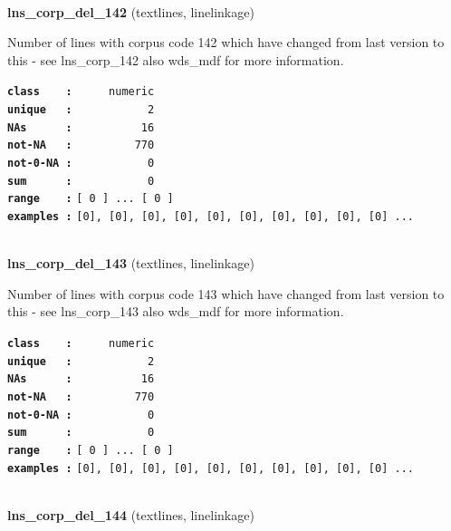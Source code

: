 \documentclass[]{article}
\begin{document}
~

\textbf{lns\_corp\_del\_142} (textlines, linelinkage)

Number of lines with corpus code 142 which have changed from last
version to this - see lns\_corp\_142 also wds\_mdf for more information.

\textbf{\texttt{class\ \ \ \ :}} \texttt{~~~~~numeric}\\
\textbf{\texttt{unique\ \ \ :}} \texttt{~~~~~~~~~~~2}\\
\textbf{\texttt{NAs\ \ \ \ \ \ :}} \texttt{~~~~~~~~~~16}\\
\textbf{\texttt{not-NA\ \ \ :}} \texttt{~~~~~~~~~770}\\
\textbf{\texttt{not-0-NA\ :}} \texttt{~~~~~~~~~~~0}\\
\textbf{\texttt{sum\ \ \ \ \ \ :}} \texttt{~~~~~~~~~~~0}\\
\textbf{\texttt{range\ \ \ \ :}}
\texttt{{[}\ 0\ {]}\ ...\ {[}\ 0\ {]}}\\
\textbf{\texttt{examples\ :}}
\texttt{{[}0{]},\ {[}0{]},\ {[}0{]},\ {[}0{]},\ {[}0{]},\ {[}0{]},\ {[}0{]},\ {[}0{]},\ {[}0{]},\ {[}0{]}\ ...}\\

~

\textbf{lns\_corp\_del\_143} (textlines, linelinkage)

Number of lines with corpus code 143 which have changed from last
version to this - see lns\_corp\_143 also wds\_mdf for more information.

\textbf{\texttt{class\ \ \ \ :}} \texttt{~~~~~numeric}\\
\textbf{\texttt{unique\ \ \ :}} \texttt{~~~~~~~~~~~2}\\
\textbf{\texttt{NAs\ \ \ \ \ \ :}} \texttt{~~~~~~~~~~16}\\
\textbf{\texttt{not-NA\ \ \ :}} \texttt{~~~~~~~~~770}\\
\textbf{\texttt{not-0-NA\ :}} \texttt{~~~~~~~~~~~0}\\
\textbf{\texttt{sum\ \ \ \ \ \ :}} \texttt{~~~~~~~~~~~0}\\
\textbf{\texttt{range\ \ \ \ :}}
\texttt{{[}\ 0\ {]}\ ...\ {[}\ 0\ {]}}\\
\textbf{\texttt{examples\ :}}
\texttt{{[}0{]},\ {[}0{]},\ {[}0{]},\ {[}0{]},\ {[}0{]},\ {[}0{]},\ {[}0{]},\ {[}0{]},\ {[}0{]},\ {[}0{]}\ ...}\\

~

\textbf{lns\_corp\_del\_144} (textlines, linelinkage)
\end{document}
